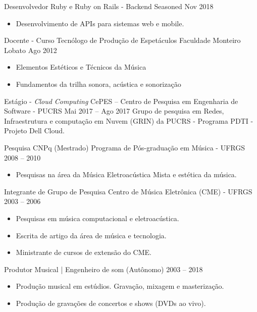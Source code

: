 \documentclass[10pt,a4paper]{altacv}
\begin{document}
\medskip


\cvevent
{Desenvolvedor Ruby e Ruby on Rails - Backend}
{Seasoned}
{Nov 2018}{}
\begin{itemize}
\item Desenvolvimento de APIs para sistemas web e mobile.
\end{itemize}

\divider

\cvevent
{Docente - Curso Tecnólogo de Produção de Espetáculos}
{Faculdade Monteiro Lobato}
{Ago 2012}{}
\begin{itemize}
\item Elementos Estéticos e Técnicos da Música
\item Fundamentos da trilha sonora, acústica e sonorização
\end{itemize}

\divider

\cvevent
{Estágio - \textit{Cloud Computing}}
{CePES – Centro de Pesquisa em Engenharia de Software - PUCRS}
{Mai 2017 -- Ago 2017}{}
Grupo de pesquisa em Redes, Infraestrutura e computação em Nuvem (GRIN) da PUCRS - Programa PDTI - Projeto Dell Cloud.

\divider

\cvevent
{Pesquisa CNPq (Mestrado)}
{Programa de Pós-graduação em Música - UFRGS}
{2008 -- 2010}{}
\begin{itemize}
\item Pesquisas na área da Música Eletroacústica Mista e estética da música.
\end{itemize}

\divider

\cvevent
{Integrante de Grupo de Pesquisa}
{Centro de Música Eletrônica (CME) - UFRGS}
{2003 -- 2006}{}
\begin{itemize}
\item Pesquisas em música computacional e eletroacústica.
\item Escrita de artigo da área de música e tecnologia.
\item Ministrante de cursos de extensão do CME.
\end{itemize}

\divider

\cvevent
{Produtor Musical | Engenheiro de som}
{(Autônomo)}
{2003 -- 2018}{}
\begin{itemize}
\item Produção musical em estúdios. Gravação, mixagem e masterização.
\item Produção de gravações de concertos e shows (DVDs ao vivo).
\end{itemize}
\end{document}
